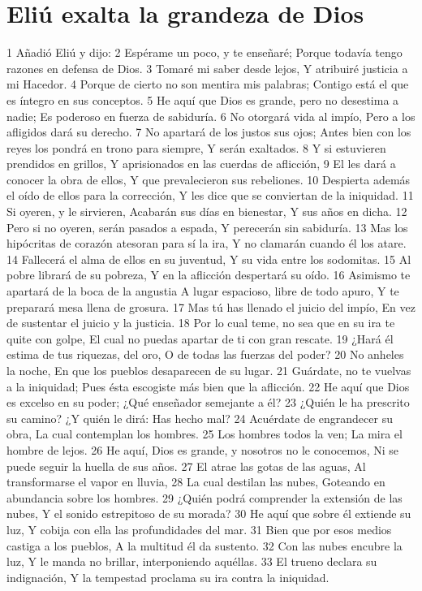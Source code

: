 \section*{Eliú exalta la grandeza de Dios}

1 Añadió Eliú y dijo:
2 Espérame un poco, y te enseñaré;
Porque todavía tengo razones en defensa de Dios. 
3 Tomaré mi saber desde lejos,
Y atribuiré justicia a mi Hacedor.
4 Porque de cierto no son mentira mis palabras;
Contigo está el que es íntegro en sus conceptos.
5 He aquí que Dios es grande, pero no desestima a nadie;
Es poderoso en fuerza de sabiduría.
6 No otorgará vida al impío,
Pero a los afligidos dará su derecho.
7 No apartará de los justos sus ojos;
Antes bien con los reyes los pondrá en trono para siempre,
Y serán exaltados.
8 Y si estuvieren prendidos en grillos,
Y aprisionados en las cuerdas de aflicción,
9 El les dará a conocer la obra de ellos,
Y que prevalecieron sus rebeliones. 
10 Despierta además el oído de ellos para la corrección,
Y les dice que se conviertan de la iniquidad.
11 Si oyeren, y le sirvieren,
Acabarán sus días en bienestar,
Y sus años en dicha.
12 Pero si no oyeren, serán pasados a espada,
Y perecerán sin sabiduría.
13 Mas los hipócritas de corazón atesoran para sí la ira,
Y no clamarán cuando él los atare.
14 Fallecerá el alma de ellos en su juventud,
Y su vida entre los sodomitas.
15 Al pobre librará de su pobreza,
Y en la aflicción despertará su oído.
16 Asimismo te apartará de la boca de la angustia
A lugar espacioso, libre de todo apuro,
Y te preparará mesa llena de grosura.
17 Mas tú has llenado el juicio del impío,
En vez de sustentar el juicio y la justicia.
18 Por lo cual teme, no sea que en su ira te quite con golpe,
El cual no puedas apartar de ti con gran rescate. 
19 ¿Hará él estima de tus riquezas, del oro,
O de todas las fuerzas del poder?
20 No anheles la noche,
En que los pueblos desaparecen de su lugar.
21 Guárdate, no te vuelvas a la iniquidad;
Pues ésta escogiste más bien que la aflicción.
22 He aquí que Dios es excelso en su poder;
¿Qué enseñador semejante a él?
23 ¿Quién le ha prescrito su camino?
¿Y quién le dirá: Has hecho mal?
24 Acuérdate de engrandecer su obra,
La cual contemplan los hombres.
25 Los hombres todos la ven;
La mira el hombre de lejos.
26 He aquí, Dios es grande, y nosotros no le conocemos,
Ni se puede seguir la huella de sus años.
27 El atrae las gotas de las aguas,
Al transformarse el vapor en lluvia,
28 La cual destilan las nubes,
Goteando en abundancia sobre los hombres.
29 ¿Quién podrá comprender la extensión de las nubes,
Y el sonido estrepitoso de su morada?
30 He aquí que sobre él extiende su luz,
Y cobija con ella las profundidades del mar.
31 Bien que por esos medios castiga a los pueblos,
A la multitud él da sustento.
32 Con las nubes encubre la luz,
Y le manda no brillar, interponiendo aquéllas.
33 El trueno declara su indignación,
Y la tempestad proclama su ira contra la iniquidad.

